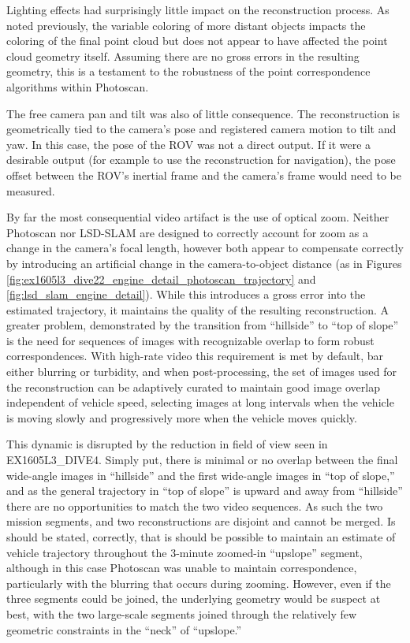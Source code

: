 \documentclass[letterpaper,12pt]{article}
\begin{document}
Lighting effects had surprisingly little impact on the reconstruction process.  As noted previously, the variable coloring of more distant objects impacts the coloring of the final point cloud but does not appear to have affected the point cloud geometry itself.   Assuming there are no gross errors in the resulting geometry, this is a testament to the robustness of the point correspondence algorithms within Photoscan.  

The free camera pan and tilt was also of little consequence.  The reconstruction is geometrically tied to the camera's pose and registered camera motion to tilt and yaw.   In this case, the pose of the ROV was not a direct output.   If it were a desirable output (for example to use the reconstruction for navigation), the pose offset between the ROV's inertial frame and the camera's frame would need to be measured.

By far the most consequential video artifact is the use of optical zoom.   Neither Photoscan nor LSD-SLAM are designed to correctly account for zoom as a change in the camera's focal length, however both appear to compensate correctly by introducing an artificial change in the camera-to-object distance (as in Figures \ref{fig:ex1605l3_dive22_engine_detail_photoscan_trajectory} and \ref{fig:lsd_slam_engine_detail}).   While this introduces a gross error into the estimated trajectory, it maintains the quality of the resulting reconstruction.    A greater problem, demonstrated by the transition from ``hillside'' to ``top of slope'' is the need for sequences of images with recognizable overlap to form robust correspondences.  With high-rate video this requirement is met by default, bar either blurring or turbidity, and when post-processing, the set of images used for the reconstruction can be adaptively curated to maintain good image overlap independent of vehicle speed, selecting images at long intervals when the vehicle is moving slowly and progressively more when the vehicle moves quickly.

This dynamic is disrupted by the reduction in field of view seen in EX1605L3\_DIVE4.    Simply put, there is minimal or no overlap between the final wide-angle images in ``hillside'' and the first wide-angle images in ``top of slope,'' and as the general trajectory in ``top of slope'' is upward and away from ``hillside'' there are no opportunities to match the two video sequences.   As such the two mission segments, and two reconstructions are disjoint and cannot be merged.    Is should be stated, correctly, that is should be possible to maintain an estimate of vehicle trajectory throughout the 3-minute zoomed-in ``upslope'' segment, although in this case Photoscan was unable to maintain correspondence, particularly with the blurring that occurs during zooming.    However, even if the three segments could be joined, the underlying geometry would be suspect at best, with the two large-scale segments joined through the relatively few geometric constraints in the ``neck'' of ``upslope.'' 
\end{document}
